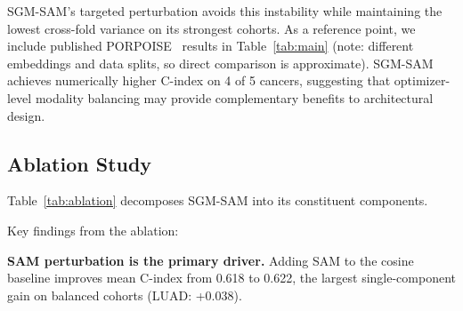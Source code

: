\documentclass[runningheads]{llncs}
\begin{document}
SGM-SAM's targeted perturbation avoids this instability while
maintaining the lowest cross-fold variance on its strongest cohorts.
As a reference point, we include published
PORPOISE~\cite{chen2022porpoise} results in Table~\ref{tab:main}
(note: different embeddings and data splits, so direct comparison is
approximate). SGM-SAM achieves numerically higher C-index on 4 of 5
cancers, suggesting that optimizer-level modality balancing may
provide complementary benefits to architectural design.

\subsection{Ablation Study}

Table~\ref{tab:ablation} decomposes SGM-SAM into its constituent
components.

\begin{table}[t]
\centering
\caption{Ablation study (Test C-index, 5-fold CV). Each row adds or
modifies one component relative to the cosine baseline.}
\label{tab:ablation}

\end{table}

Key findings from the ablation:

\textbf{SAM perturbation is the primary driver.} Adding SAM to the
cosine baseline improves mean C-index from 0.618 to 0.622, the
largest single-component gain on balanced cohorts (LUAD: +0.038).
\end{document}
